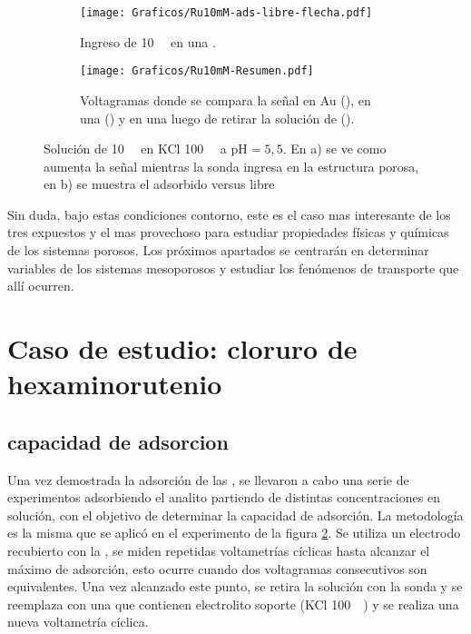 			\begin{figure}[ht!]
				\begin{subfigure}[t]{0.495\textwidth}
				\texttt{[image: Graficos/Ru10mM-ads-libre-flecha.pdf]}
		        \caption{Ingreso de \aminorutenio\space \SI{10}{\milli\Molar} en una \pdmF.}
		        \label{fig:Ru10mM_ingreso}
		      	\end{subfigure}
		      	\begin{subfigure}[t]{0.495\textwidth}
				\texttt{[image: Graficos/Ru10mM-Resumen.pdf]}
		        \caption{Voltagramas donde se compara la señal en Au (\usebox{\rojo}), en una \pdmF\space(\usebox{\oliva}) y en una \pdmF\space luego de retirar la solución de \aminorutenio (\usebox{\azul}).}
		        \label{fig:Ru10mM-resumen}
		      	\end{subfigure}
		      	\caption[Adsorción de sonda positiva en \pdm]{Solución de \aminorutenio\space \SI{10}{\milli\Molar} en KCl \SI{100}{\milli\Molar} a $\text{pH}=5,5$. En a) se ve como aumenta la señal mientras la sonda ingresa en la estructura porosa, en b) se muestra el adsorbido versus libre}
		      	\label{fig:Ru10mM}
		      	\end{figure}


		Sin duda, bajo estas condiciones contorno, este es el caso mas interesante de los tres expuestos y el mas provechoso para estudiar propiedades físicas y químicas de los sistemas porosos. Los próximos apartados se centrarán en determinar variables de los sistemas mesoporosos y estudiar los fenómenos de transporte que allí ocurren.

\section{Caso de estudio: cloruro de hexaminorutenio}
	
	\subsection{capacidad de adsorcion}

	Una vez demostrada la adsorción \aminorutenio\space de las \pdm, se llevaron a cabo una serie de experimentos adsorbiendo el analito partiendo de distintas concentraciones en solución, con el objetivo de determinar la capacidad de adsorción. La metodología es la misma que se aplicó en el experimento de la figura \ref{fig:Ru10mM-resumen}. Se utiliza un electrodo recubierto con la \pdmF\space, se miden repetidas voltametrías cíclicas hasta alcanzar el máximo de adsorción, esto ocurre cuando dos voltagramas consecutivos son equivalentes. Una vez alcanzado este punto, se retira la solución con la sonda y se reemplaza con una que contienen electrolito soporte (KCl \SI{100}{\milli\Molar}) y se realiza una nueva voltametría cíclica. 

